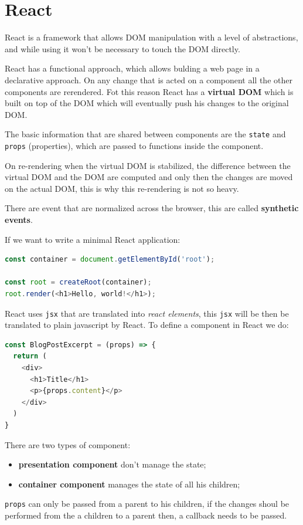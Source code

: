 \documentclass[12pt]{article}
\begin{document}
\newpage
\section{React}
React is a framework that allows DOM manipulation with a level of abstractions, and while using it won't be necessary to touch the DOM directly.

React has a functional approach, which allows bulding a web page in a declarative approach. On any change that is acted on a component all the other components are rerendered. Fot this reason React has a \textbf{virtual DOM} which is built on top of the DOM which will eventually push his changes to the original DOM.

The basic information that are shared between components are the \texttt{state} and \texttt{props} (properties), which are passed to functions inside the component.

On re-rendering when the virtual DOM is stabilized, the difference between the virtual DOM and the DOM are computed and only then the changes are moved on the actual DOM, this is why this re-rendering is not so heavy.

There are event that are normalized across the browser, this are called \textbf{synthetic events}.

If we want to write a minimal React application:
\begin{lstlisting}[language=js]
const container = document.getElementById('root');

const root = createRoot(container);
root.render(<h1>Hello, world!</h1>);
\end{lstlisting}
React uses \texttt{jsx} that are translated into \emph{react elements}, this \texttt{jsx} will be then be translated to plain javascript by React. To define a component in React we do:
\begin{lstlisting}[language=js]
const BlogPostExcerpt = (props) => {
  return (
    <div>
      <h1>Title</h1>
      <p>{props.content}</p>
    </div>
  )
}
\end{lstlisting}
There are two types of component: 
\begin{itemize}
  \item \textbf{presentation component} don't manage the state;
  \item \textbf{container component} manages the state of all his children;
\end{itemize}
\texttt{props} can only be passed from a parent to his children, if the changes shoul be performed from the a children to a parent then, a callback needs to be passed.
\end{document}
